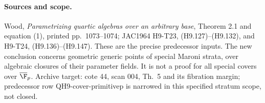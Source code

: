 \documentclass[11pt]{article}
\theoremstyle{remark}\newtheorem{remark}[theorem]{Remark}
\begin{document}
\paragraph{Sources and scope.}
Wood, \emph{Parametrizing quartic algebras over an arbitrary base},
Theorem 2.1 and equation (1), printed pp.~1073--1074; JAC1964 H9-T23,
(H9.127)--(H9.132), and H9-T24, (H9.136)--(H9.147). These are the
precise predecessor inputs. The new conclusion concerns geometric
generic points of special Maroni strata, over algebraic closures of
their parameter fields. It is not a proof for all special covers over
$\overline{\F}_p$. Archive target: cote 44, scan 004, Th.~5 and its
fibration margin; predecessor row QH9-cover-primitivep is narrowed in
this specified stratum scope, not closed.


\end{document}
